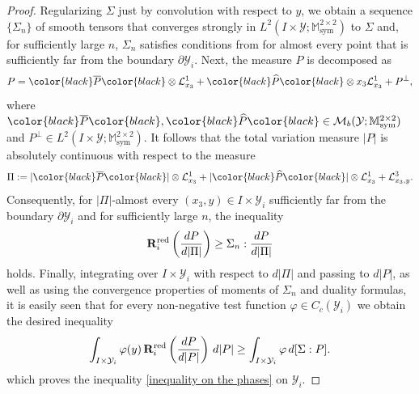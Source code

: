 \documentclass[reqno,10pt]{amsart}
\numberwithin{equation}{section}
\theoremstyle{remark}
\newcommand{\BLACK}{\color{black}}
\newcommand{\PINK}{\color{black}}
\newcommand{\calL}{\mathcal{L}}
\newcommand{\M}{\mathbb{M}}
\newcommand{\calY}{\mathcal{Y}}
\DeclareMathOperator{\sym}{sym}
\newcommand{\zerothI}[1]{\overline{#1}}
\newcommand{\firstI}[1]{\widehat{#1}}
\newcommand{\Mb}{\mathcal{M}_b}
\newcommand{\disspot}{\mathbf{R}}
\begin{document}
\begin{proof}
Regularizing $\Sigma$ just by convolution with respect to $y$, we obtain a sequence $\{\Sigma_n\}$ of smooth tensors that converges strongly in $L^2(I \times \calY; \M^{2 \times 2}_{\sym})$ to $\Sigma$ and, for sufficiently large $n$, $\Sigma_n$ satisfies conditions from  for almost every point that is sufficiently far from the boundary $\partial\calY_i$. 
Next, the measure $P$ is decomposed as
\begin{equation*}
	P = {\PINK\zerothI{P}\BLACK} \otimes \calL^{1}_{x_3} + {\PINK\firstI{P}\BLACK} \otimes x_3 \calL^{1}_{x_3} + P^\perp,
\end{equation*}
where ${\PINK\zerothI{P}\BLACK}, {\PINK\firstI{P}\BLACK} \in \Mb(\calY;\M^{2 \times 2}_{\sym})$ and $P^\perp \in L^2(I \times \calY;\M^{2 \times 2}_{\sym})$. 
It follows that the total variation measure $|P|$ is absolutely continuous with respect to the measure
\begin{equation*}
	\Pi := |{\PINK\zerothI{P}\BLACK}| \otimes \calL^{1}_{x_3} + |{\PINK\firstI{P}\BLACK}| \otimes \calL^{1}_{x_3} + \calL^{3}_{x_3,y}.
\end{equation*}
Consequently, for $|\Pi|$-almost every $(x_3,y) \in I \times \calY_i$ sufficiently far from the boundary $\partial\calY_i$ and for sufficiently large $n$, the inequality
\begin{equation}
	\disspot^{\rm red}_i\left(\frac{dP}{d|\Pi|}\right) \geq \Sigma_n : \frac{dP}{d|\Pi|}
\end{equation}
holds. 
Finally, integrating over $I \times \calY_i$ with respect to $d|\Pi|$ and passing to $d|P|$, as well as using the convergence properties of moments of $\Sigma_n$ and duality formulas, it is easily seen that for every non-negative test function $\varphi \in C_c(\calY_i)$ we obtain the desired inequality
\begin{equation*}
	\int_{I \times \calY_i} \varphi(y)\,\disspot^{\rm red}_i\left(\frac{dP}{d|P|}\right) \,d|P| \geq \int_{I \times \calY_i} \varphi \,d[ \Sigma : P ].
\end{equation*}
which proves the inequality \eqref{inequality on the phases} on $\calY_i$.


\end{proof}
\end{document}
